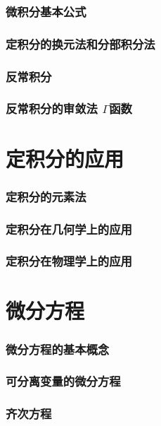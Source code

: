 \documentclass{article}
\begin{document}
  \section{微积分基本公式}
    
  \section{定积分的换元法和分部积分法}
    
  \section{反常积分}
    
  \section[反常积分的审敛法 Γ函数]{反常积分的审敛法 $\Gamma$函数}
    

  \newpage
  \part{定积分的应用}
  \section{定积分的元素法}
    
  \section{定积分在几何学上的应用}
    
  \section{定积分在物理学上的应用}
    

  \newpage
  \part{微分方程}
  \section{微分方程的基本概念}
    
  \section{可分离变量的微分方程}
    
  \section{齐次方程}
    
\end{document}
